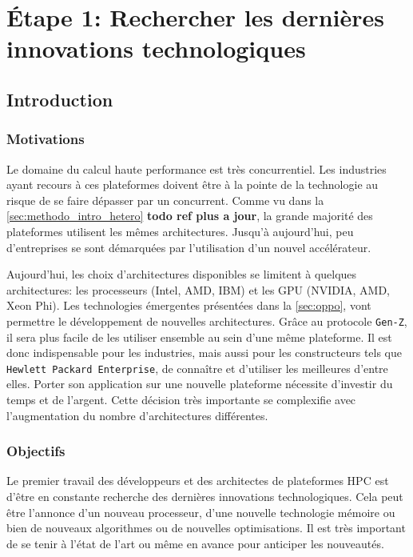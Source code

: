 \section{Étape 1: Rechercher les dernières innovations technologiques}\label{sec:methodo_step1}


\subsection{Introduction}
    
    \subsubsection{Motivations}
    
        Le domaine du calcul haute performance est très concurrentiel. Les industries ayant recours à ces plateformes doivent être à la pointe de la technologie au risque de se faire dépasser par un concurrent. 
        Comme vu dans la \autoref{sec:methodo_intro_hetero} \textbf{todo ref plus a jour}, la grande majorité des plateformes utilisent les mêmes architectures. Jusqu'à aujourd'hui, peu d'entreprises se sont démarquées par l'utilisation d'un nouvel accélérateur.
      
        Aujourd'hui, les choix d'architectures disponibles se limitent à quelques architectures: les processeurs (Intel, AMD, IBM) et les \gls{GPU} (NVIDIA, AMD, Xeon Phi). Les technologies émergentes présentées dans la \autoref{sec:oppo}, vont permettre le développement de nouvelles architectures. Grâce au protocole \verb=Gen-Z=, il sera plus facile de les utiliser ensemble au sein d'une même plateforme. Il est donc indispensable pour les industries, mais aussi pour les constructeurs tels que \verb=Hewlett Packard Enterprise=, de connaître et d'utiliser les meilleures d'entre elles. Porter son application sur une nouvelle plateforme nécessite d'investir du temps et de l'argent. Cette décision très importante se complexifie avec l'augmentation du nombre d'architectures différentes.
   
   \subsubsection{Objectifs}
        
        Le premier travail des développeurs et des architectes de plateformes \gls{HPC} est d'être en constante recherche des dernières innovations technologiques. Cela peut être l'annonce d'un nouveau processeur, d'une nouvelle technologie mémoire ou bien de nouveaux algorithmes ou de nouvelles optimisations. Il est très important de se tenir à l'état de l'art ou même en avance pour anticiper les nouveautés. 

